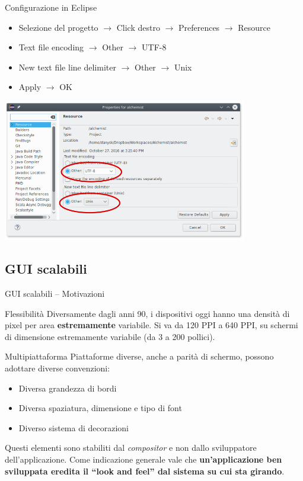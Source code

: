 \documentclass[presentation]{beamer}
\begin{document}
\begin{frame}{Configurazione in Eclipse}
\begin{itemize}
	\item Selezione del progetto $\rightarrow$ Click destro $\rightarrow$ Preferences $\rightarrow$ Resource
	\item Text file encoding $\rightarrow$ Other $\rightarrow$ UTF-8
	\item New text file line delimiter $\rightarrow$ Other $\rightarrow$ Unix
	\item Apply $\rightarrow$ OK
\end{itemize}

\begin{center}
\includegraphics[width=0.8\textwidth]{img/eclipse-encoding}
\end{center}
\end{frame}

\subsection{GUI scalabili}

\begin{frame}{GUI scalabili -- Motivazioni}
\begin{block}{Flessibilità}
Diversamente dagli anni 90, i dispositivi oggi hanno una densità di pixel per area \textbf{estremamente} variabile. Si va da 120 PPI a 640 PPI, su schermi di dimensione estremamente variabile (da 3 a 200 pollici).
\end{block}

\begin{block}{Multipiattaforma}
Piattaforme diverse, anche a parità di schermo, possono adottare diverse convenzioni:
\begin{itemize}
\item Diversa grandezza di bordi
\item Diversa spaziatura, dimensione e tipo di font
\item Diverso sistema di decorazioni
\end{itemize}

Questi elementi sono stabiliti dal \emph{compositor} e non dallo sviluppatore dell'applicazione. Come indicazione generale vale che \textbf{un'applicazione ben sviluppata eredita il ``look and feel'' dal sistema su cui sta girando}.
\end{block}
\end{frame}
\end{document}
